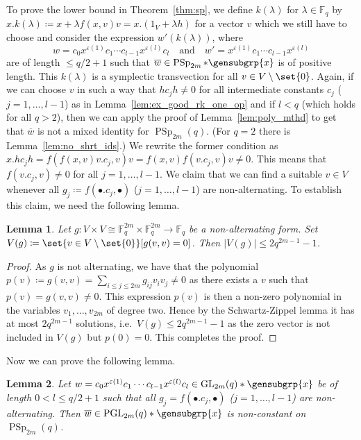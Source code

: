 \documentclass[a4paper,11pt]{amsproc}
\newcommand{\card}[1]{\left\lvert#1\right\rvert}%
\newcommand{\finfield}{\mathbb{F}}%
\DeclareMathOperator{\PSp}{PSp}%
\DeclareMathOperator{\GL}{GL}%
\DeclareMathOperator{\PGL}{PGL}%
\theoremstyle{plain}
\newtheorem{lemma}{Lemma}[section]
\theoremstyle{definition}
\begin{document}
	To prove the lower bound in Theorem~\ref{thm:sp}, we define $k(\lambda)$ for $\lambda\in\finfield_q$ by $x.k(\lambda)\coloneqq x+\lambda f(x,v)v=x.(1_V+\lambda h)$ for a vector $v$ which we still have to choose and consider the expression $w'(k(\lambda))$, where 
	$$
	w=c_0x^{\varepsilon(1)}c_1\cdots c_{l-1}x^{\varepsilon(l)}c_l \quad\text{and}\quad w'=x^{\varepsilon(1)}c_1\cdots c_{l-1}x^{\varepsilon(l)}
	$$ 
	are of length $\leq q/2+1$ such that $\overline{w}\in\PSp_{2m}\ast\gensubgrp{x}$ is of positive length. This $k(\lambda)$ is a symplectic transvection for all $v\in V\setminus\set{0}$. Again, if we can choose $v$ in such a way that $hc_j h\neq 0$ for all intermediate constants $c_j$ ($j=1,\ldots,l-1$) as in Lemma~\ref{lem:ex_good_rk_one_op} and if $l<q$ (which holds for all $q>2$), then we can apply the proof of Lemma~\ref{lem:poly_mthd} to get that $\overline{w}$ is not a mixed identity for $\PSp_{2m}(q)$. (For $q=2$ there is Lemma~\ref{lem:no_shrt_ids}.) We rewrite the former condition as $x.hc_jh=f(f(x,v)v.c_j,v)v=f(x,v)f(v.c_j,v)v\neq 0$. This means that $f(v.c_j,v)\neq 0$ for all $j=1,\ldots,l-1$. We claim that we can find a suitable $v\in V$ whenever all $g_j\coloneqq f(\bullet.c_j,\bullet)$ ($j=1,\ldots,l-1$) are non-alternating. To establish this claim, we need the following lemma.
	
	\begin{lemma}\label{lem:non_alt_frm}
		Let $g\colon V\times V\cong\finfield_q^{2m}\times\finfield_q^{2m}\to\finfield_q$ be a non-alternating form. Set $V(g)\coloneqq\set{v\in V\setminus\set{0}}[g(v,v)=0]$. Then $\card{V(g)}\leq 2 q^{2m-1}-1$.
	\end{lemma}
	
	\begin{proof}
		As $g$ is not alternating, we have that the polynomial $p(v)\coloneqq g(v,v)=\sum_{i\leq j\leq 2m}{g_{ij}v_iv_j}\neq 0$ as there exists a $v$ such that $p(v)=g(v,v)\neq 0$. This expression $p(v)$ is then a non-zero polynomial in the variables $v_1,\ldots,v_{2m}$ of degree two. Hence by the Schwartz-Zippel lemma it has at most $2 q^{2m-1}$ solutions, i.e.\ $V(g)\leq 2 q^{2m-1}-1$ as the zero vector is not included in $V(g)$ but $p(0)=0$. This completes the proof.
	\end{proof}
	
	Now we can prove the following lemma.
	
	\begin{lemma}\label{lem:non_alt_frms_sol}
		Let $w=c_0x^{\varepsilon(1)}c_1\cdots c_{l-1}x^{\varepsilon(l)}c_l\in\GL_{2m}(q)\ast\gensubgrp{x}$ be of length $0<l\leq q/2+1$ such that all $g_j=f(\bullet.c_j,\bullet)$ ($j=1,\ldots,l-1$) are non-alternating. Then $\overline{w}\in\PGL_{2m}(q)\ast\gensubgrp{x}$ is non-constant on $\PSp_{2m}(q)$.
	\end{lemma}
	
\end{document}
